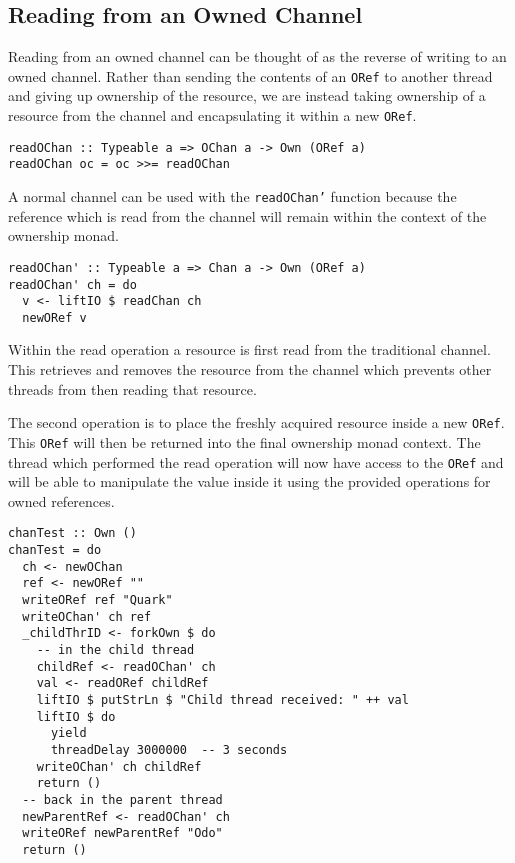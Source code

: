 \documentclass[onehalf,11pt]{beavtex}
\begin{document}
\subsection{Reading from an Owned Channel}

Reading from an owned channel can be thought of as the reverse of writing to an
owned channel.
Rather than sending the contents of an \texttt{ORef} to another thread and giving 
up ownership of the resource,
we are instead taking ownership of a resource from the channel and encapsulating
it within a new \texttt{ORef}.

\begin{verbatim}
readOChan :: Typeable a => OChan a -> Own (ORef a)
readOChan oc = oc >>= readOChan
\end{verbatim}

A normal channel can be used with the \texttt{readOChan'} function because
the reference which is read from the channel will remain within the context
of the ownership monad. 

\begin{verbatim}
readOChan' :: Typeable a => Chan a -> Own (ORef a)
readOChan' ch = do
  v <- liftIO $ readChan ch
  newORef v
\end{verbatim}

Within the read operation a resource is first read from the traditional
channel.
This retrieves and removes the resource from the channel which prevents other
threads from then reading that resource.

The second operation is to place the freshly acquired resource inside a new
\texttt{ORef}.  This \texttt{ORef} will then be returned into the
final ownership monad context.
The thread which performed the read operation will now have access to the
\texttt{ORef} and will be able to manipulate the value inside it using the
provided operations for owned references. \\

\begin{lstlisting}
chanTest :: Own ()
chanTest = do
  ch <- newOChan
  ref <- newORef ""
  writeORef ref "Quark"
  writeOChan' ch ref
  _childThrID <- forkOwn $ do
    -- in the child thread
    childRef <- readOChan' ch
    val <- readORef childRef
    liftIO $ putStrLn $ "Child thread received: " ++ val
    liftIO $ do 
      yield
      threadDelay 3000000  -- 3 seconds
    writeOChan' ch childRef
    return ()
  -- back in the parent thread
  newParentRef <- readOChan' ch
  writeORef newParentRef "Odo"
  return ()
\end{lstlisting}
\end{document}
